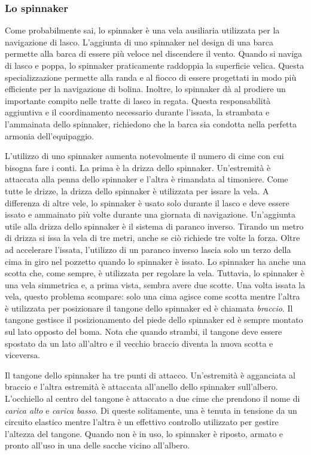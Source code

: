 \subsubsection{Lo spinnaker}
\label{sec:spinnaker}
Come probabilmente sai, lo spinnaker è una vela ausiliaria utilizzata
per la navigazione di lasco. L'aggiunta di uno spinnaker nel design di una barca
permette alla barca di essere più veloce nel discendere il vento. Quando si
naviga di lasco e poppa, lo spinnaker praticamente raddoppia la superficie
velica. Questa specializzazione permette alla randa e al fiocco di essere
progettati in modo più efficiente per la navigazione di bolina. Inoltre, lo
spinnaker dà al prodiere un importante compito nelle tratte di lasco in regata.
Questa responsabilità aggiuntiva e il coordinamento necessario durante l'issata,
la strambata e l'ammainata dello spinnaker, richiedono che la barca sia
condotta nella perfetta armonia dell'equipaggio.

L'utilizzo di uno spinnaker aumenta notevolmente il numero di cime con cui
bisogna fare i conti. La prima è la drizza dello spinnaker. Un'estremità è
attaccata alla penna dello spinnaker e l'altra è rimandata al timoniere. Come
tutte le drizze, la drizza dello spinnaker è utilizzata per issare la vela. A
differenza di altre vele, lo spinnaker è usato solo durante il lasco e deve
essere issato e ammainato più volte durante una giornata di navigazione.
Un'aggiunta utile alla drizza dello spinnaker è il sistema di paranco inverso.
Tirando un metro di drizza si issa la vela di tre metri, anche se ciò richiede
tre volte la forza. Oltre ad accelerare l'issata, l'utilizzo di un paranco
inverso lascia solo un terzo della cima in giro nel pozzetto quando lo spinnaker
è issato. Lo spinnaker ha anche una scotta che, come sempre, è utilizzata per
regolare la vela. Tuttavia, lo spinnaker è una vela simmetrica e, a prima vista,
sembra avere due scotte. Una volta issata la vela, questo problema scompare:
solo una cima agisce come scotta mentre l'altra è utilizzata per posizionare il
tangone dello spinnaker ed è chiamata \emph{braccio}. Il tangone gestisce il
posizionamento del piede dello spinnaker ed è sempre montato sul lato opposto
del boma. Nota che quando strambi, il tangone deve essere spostato da un lato
all'altro e il vecchio braccio diventa la nuova scotta e viceversa.

Il tangone dello spinnaker ha tre punti di attacco. Un'estremità è agganciata al
braccio e l'altra estremità è attaccata all'anello dello spinnaker sull'albero.
L'occhiello al centro del tangone è attaccato a due cime che prendono il nome di
\emph{carica alto} e \emph{carica basso}. Di queste solitamente, una è tenuta in
tensione da un circuito elastico mentre l'altra è un effettivo controllo
utilizzato per gestire l'altezza del tangone. Quando non è in uso, lo spinnaker
è riposto, armato e pronto all'uso in una delle sacche vicino all'albero.

